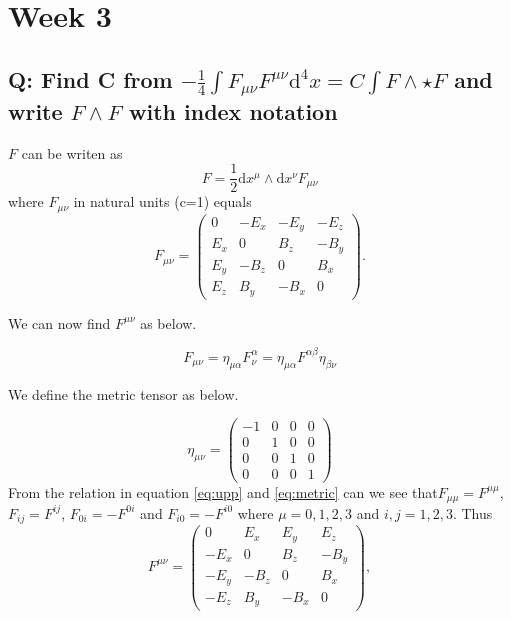 \section{Week 3}
\subsection{Q: Find C from $-\frac{1}{4}\int F_{\mu \nu} F^{\mu \nu} \mathrm{d}^4x=C \int F \wedge \star F$ and write $F \wedge  F$ with index notation}
$F$ can be writen as 
\begin{equation}
F=\frac{1}{2}\mathrm{d}x^{\mu} \wedge \mathrm{d }x^{\nu} F_{\mu\nu}
\label{eq:F2}
\end{equation}
where $F_{\mu \nu}$ in natural units (c=1) equals
\begin{equation}
F_{\mu\nu} = \begin{pmatrix} 0 & -E_x & -E_y & -E_z \\ E_x & 0 & B_z & -B_y \\ E_y & -B_z & 0 & B_x \\ E_z & B_y & -B_x & 0 \end{pmatrix}.
\label{eq:F-mat2}
\end{equation} 

We can now find $F^{\mu \nu}$  as below.

\begin{equation}
F_{\mu \nu}=\eta_{\mu \alpha} F^\alpha _\nu=\eta_{\mu \alpha} F^{\alpha \beta} \eta_{\beta \nu}
\label{eq:upp}
\end{equation}


We define the metric tensor as below. 

\begin{equation}
\eta_{\mu \nu} = \begin{pmatrix}-1&0&0&0\\0&1&0&0\\0&0&1&0\\0&0&0&1\end{pmatrix}
\label{eq:metric}
\end{equation}
From the relation in equation \ref{eq:upp} and \ref{eq:metric}  can we see that$F_{\mu \mu}=F^{\mu \mu}$, $F_{i j}=F^{i j}$, $F_{0 i}=-F^{0 i}$ and $F_{i 0}=-F^{i 0}$ where $\mu=0,1,2,3$ and $i,j=1,2, 3$.
Thus
\[
F^{\mu\nu} =  \begin{pmatrix} 0 & E_x & E_y & E_z \\ -E_x & 0 & B_z & -B_y \\ -E_y & -B_z & 0 & B_x \\ -E_z & B_y & -B_x & 0 \end{pmatrix},
\label{eq:F-matUpp}
\]


